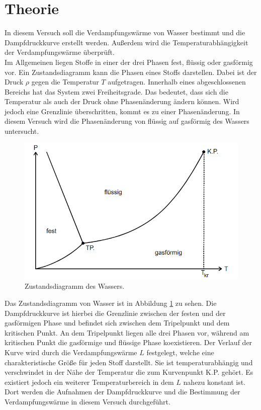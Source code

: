\section{Theorie}
\label{sec:Theorie}
In diesem Versuch soll die Verdampfungswärme von Wasser bestimmt und die Dampfdruckkurve erstellt werden.
Außerdem wird die Temperaturabhängigkeit der Verdampfungswärme überprüft.
\\
Im Allgemeinen liegen Stoffe in einer der drei Phasen fest, flüssig oder gasförmig vor.
Ein Zustandsdiagramm kann die Phasen eines Stoffs darstellen. Dabei ist der Druck $\rho$ gegen die Temperatur $T$ aufgetragen. Innerhalb eines abgeschlossenen Bereichs 
hat das System zwei Freiheitsgrade. Das bedeutet, dass sich die Temperatur als auch der Druck ohne Phasenänderung ändern können. Wird jedoch eine Grenzlinie überschritten,
kommt es zu einer Phasenänderung. 
In diesem Versuch wird die Phasenänderung von flüssig auf gasförmig des Wassers untersucht. 
\begin{figure}
    \centering
    \caption{Zustandsdiagramm des Wassers.\cite{v203}}
    \label{fig:zus}
    \includegraphics[width = 0.6 \textwidth]{pics/Phasendiagramm.png}
\end{figure}
Das Zustandsdiagramm von Wasser ist in Abbildung \ref{fig:zus} zu sehen. Die Dampfdruckkurve ist hierbei die Grenzlinie zwischen der festen und der gasförmigen Phase und befindet sich zwischen dem Tripelpunkt und dem kritischen Punkt.
An dem Tripelpunkt liegen alle drei Phasen vor, während am kritischen Punkt die gasförmige und flüssige Phase koexistieren. Der Verlauf der Kurve wird durch 
die Verdampfungswärme $L$ festgelegt, welche eine charakteristische Größe für jeden Stoff darstellt. Sie ist temperaturabhängig und verschwindet in der Nähe der Temperatur die
zum Kurvenpunkt K.P. gehört. Es existiert jedoch ein weiterer Temperaturbereich in dem $L$ nahezu konstant ist. Dort werden die Aufnahmen der Dampfdruckkurve und die Bestimmung
der Verdampfungswärme in diesem Versuch durchgeführt. 
\\
